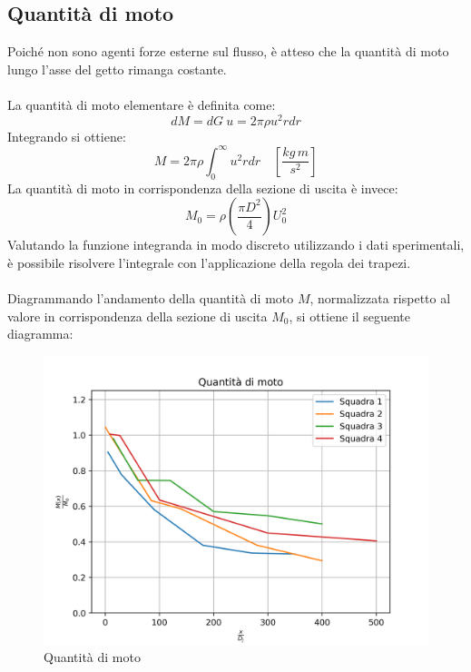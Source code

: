 \subsection{Quantità di moto}
Poiché non sono agenti forze esterne sul flusso, è atteso che la quantità di moto lungo l'asse del getto rimanga costante.\\\\
La quantità di moto elementare è definita come:
\begin{equation*}
    dM = dG\ u = 2\pi\rho u^2 rdr
\end{equation*}
Integrando si ottiene:
\begin{equation*}
    M = 2\pi\rho \int_0^\infty u^2r dr \quad \left[\frac{kg\,m}{s^2} \right]
\end{equation*}
La quantità di moto in corrispondenza della sezione di uscita è invece:
\begin{equation*}
    M_0 = \rho \left( \frac{\pi D^2}4 \right) U_0^2
\end{equation*}
Valutando la funzione integranda in modo discreto utilizzando i dati sperimentali, è possibile risolvere l'integrale con l'applicazione della regola dei trapezi.\\\\
Diagrammando l'andamento della quantità di moto $M$, normalizzata rispetto al valore in corrispondenza della sezione di uscita $M_0$, si ottiene il seguente diagramma:
\begin{figure}[h]
    \centering
    \includegraphics[width=.8\linewidth]{images/4/qdm.png}
    \caption{Quantità di moto}
\end{figure}

